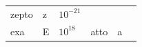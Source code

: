 {\begin{center}
\begin{xtabular*}{\mytablewidth}[t]{|p{10\mystarwidth}|p{10\mystarwidth}|p{10\mystarwidth}|p{10\mystarwidth}|p{10\mystarwidth}|p{10\mystarwidth}|}
        zepto &
    
    
        z &
    
    
        
                \begin{math}{10}^{-21}\end{math}
     \tabularnewline{}
    
    
        exa &
    
    
        E &
    
    
        
                \begin{math}{10}^{18}\end{math}
               &
    
    
        atto &
    
    
        a &
    

\end{xtabular*}
\end{center}}

